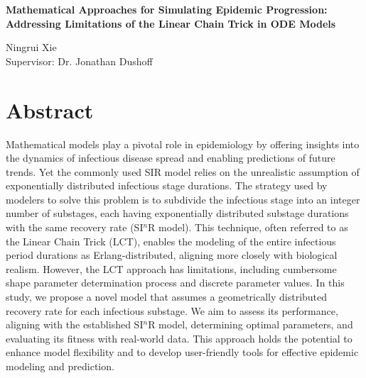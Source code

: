 \documentclass[12pt]{article}
\begin{document}
\begin{spacing}{1.0}
\begin{center}
    \Large
    \textbf{Mathematical Approaches for Simulating Epidemic Progression: Addressing Limitations of the Linear Chain Trick in ODE Models}
    
    \large
    \vspace{0.4cm}
    Ningrui Xie \\ Supervisor: Dr. Jonathan Dushoff
\end{center}
\end{spacing}

\section*{Abstract}

Mathematical models play a pivotal role in epidemiology by offering insights into the dynamics of infectious disease spread and enabling predictions of future trends. Yet the commonly used SIR model relies on the unrealistic assumption of exponentially distributed infectious stage durations. The strategy used by modelers to solve this problem is to subdivide the infectious stage into an integer number of substages, each having exponentially distributed substage durations with the same recovery rate (SI$^n$R model). This technique, often referred to as the Linear Chain Trick (LCT), enables the modeling of the entire infectious period durations as Erlang-distributed, aligning more closely with biological realism. However, the LCT approach has limitations, including cumbersome shape parameter determination process and discrete parameter values. In this study, we propose a novel model that assumes a geometrically distributed recovery rate for each infectious substage. We aim to assess its performance, aligning with the established SI$^n$R model, determining optimal parameters, and evaluating its fitness with real-world data. This approach holds the potential to enhance model flexibility and to develop user-friendly tools for effective epidemic modeling and prediction.
\pagebreak
\end{document}
